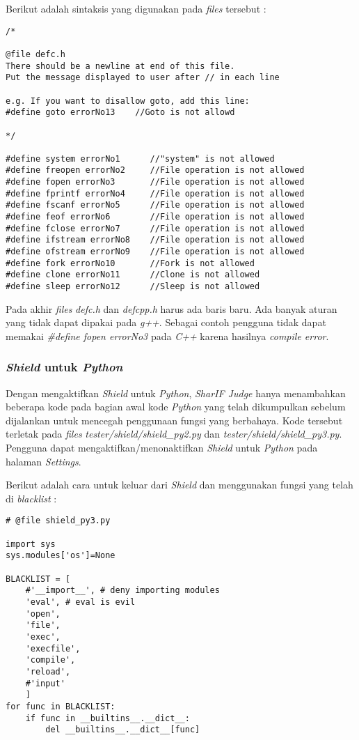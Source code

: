 Berikut adalah sintaksis yang digunakan pada \textit{files} tersebut :

\begin{lstlisting}[basicstyle=\ttfamily, frame=single,
columns=fullflexible, keepspaces=true, breaklines=true, label=ls:20]
/*

@file defc.h
There should be a newline at end of this file.
Put the message displayed to user after // in each line

e.g. If you want to disallow goto, add this line:
#define goto errorNo13    //Goto is not allowd

*/

#define system errorNo1      //"system" is not allowed
#define freopen errorNo2     //File operation is not allowed
#define fopen errorNo3       //File operation is not allowed
#define fprintf errorNo4     //File operation is not allowed
#define fscanf errorNo5      //File operation is not allowed
#define feof errorNo6        //File operation is not allowed
#define fclose errorNo7      //File operation is not allowed
#define ifstream errorNo8    //File operation is not allowed
#define ofstream errorNo9    //File operation is not allowed
#define fork errorNo10       //Fork is not allowed
#define clone errorNo11      //Clone is not allowed
#define sleep errorNo12      //Sleep is not allowed
\end{lstlisting}

Pada akhir \textit{files} \textit{defc.h} dan \textit{defcpp.h} harus ada baris baru. Ada banyak aturan yang tidak dapat dipakai pada \textit{g++}. Sebagai contoh pengguna tidak dapat memakai \textit{\#define fopen errorNo3} pada \textit{C++} karena hasilnya \textit{compile error}.

\subsubsection{\textit{Shield} untuk \textit{Python}}
\label{sec:shield_python}
Dengan mengaktifkan \textit{Shield} untuk \textit{Python}, \textit{SharIF Judge} hanya menambahkan beberapa kode pada bagian awal kode \textit{Python} yang telah dikumpulkan sebelum dijalankan untuk mencegah penggunaan fungsi yang berbahaya. Kode tersebut terletak pada \textit{files} \textit{tester/shield/shield\_py2.py} dan \textit{tester/shield/shield\_py3.py}. Pengguna dapat mengaktifkan/menonaktifkan \textit{Shield} untuk \textit{Python} pada halaman \textit{Settings}.

Berikut adalah cara untuk keluar dari \textit{Shield} dan menggunakan fungsi yang telah di \textit{blacklist} :

\begin{lstlisting}[basicstyle=\ttfamily, frame=single,
columns=fullflexible, keepspaces=true, breaklines=true, label=ls:21]
# @file shield_py3.py

import sys
sys.modules['os']=None

BLACKLIST = [
	#'__import__', # deny importing modules
	'eval', # eval is evil
	'open',
	'file',
	'exec',
	'execfile',
	'compile',
	'reload',
	#'input'
	]
for func in BLACKLIST:
	if func in __builtins__.__dict__:
		del __builtins__.__dict__[func]
\end{lstlisting}

